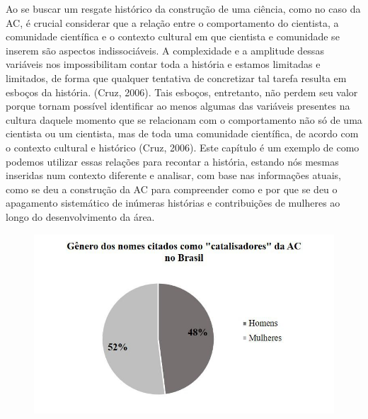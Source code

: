 Ao se buscar um resgate histórico da construção de uma ciência, como no caso da AC, é crucial considerar que a relação entre o comportamento do cientista, a comunidade científica e o contexto cultural em que cientista e comunidade se inserem são aspectos indissociáveis. A complexidade e a amplitude dessas variáveis nos impossibilitam contar toda a história e estamos limitadas e limitados, de forma que qualquer tentativa de concretizar tal tarefa resulta em esboços da história. (Cruz, 2006). Tais esboços, entretanto, não perdem seu valor porque tornam possível identificar ao menos algumas das variáveis presentes na cultura daquele momento que se relacionam com o comportamento não só de uma cientista ou um cientista, mas de toda uma comunidade científica, de acordo com o contexto cultural e histórico (Cruz, 2006). Este capítulo é um exemplo de como podemos utilizar essas relações para recontar a história, estando nós mesmas inseridas num contexto diferente e analisar, com base nas informações atuais, como se deu a construção da AC para compreender como e por que se deu o apagamento sistemático de inúmeras histórias e contribuições de mulheres ao longo do desenvolvimento da área.

\begin{figure}
\includegraphics[width=1\textwidth]{1/figura2}
\label{figura012}
\end{figure}

